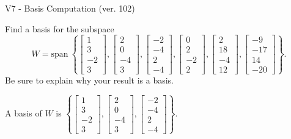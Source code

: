 \begin{exercise}
  \begin{exerciseTitle}V7 - Basis Computation (ver. 102)\end{exerciseTitle}
  \begin{exerciseStatement}
    Find a basis for the subspace 
\[W=\mathrm{span}\ \left\{\left[\begin{array}{r}
1 \\
3 \\
-2 \\
3
\end{array}\right] , \left[\begin{array}{r}
2 \\
0 \\
-4 \\
3
\end{array}\right] , \left[\begin{array}{r}
-2 \\
-4 \\
2 \\
-4
\end{array}\right] , \left[\begin{array}{r}
0 \\
2 \\
-2 \\
2
\end{array}\right] , \left[\begin{array}{r}
2 \\
18 \\
-4 \\
12
\end{array}\right] , \left[\begin{array}{r}
-9 \\
-17 \\
14 \\
-20
\end{array}\right]\right\}.\]
 Be sure to explain why your result is a basis.


  \end{exerciseStatement}
  \begin{exerciseAnswer}
   A basis of \(W\) is  \(\left\{\left[\begin{array}{r}
1 \\
3 \\
-2 \\
3
\end{array}\right] , \left[\begin{array}{r}
2 \\
0 \\
-4 \\
3
\end{array}\right] , \left[\begin{array}{r}
-2 \\
-4 \\
2 \\
-4
\end{array}\right]\right\}\).
  


  \end{exerciseAnswer}
\end{exercise}